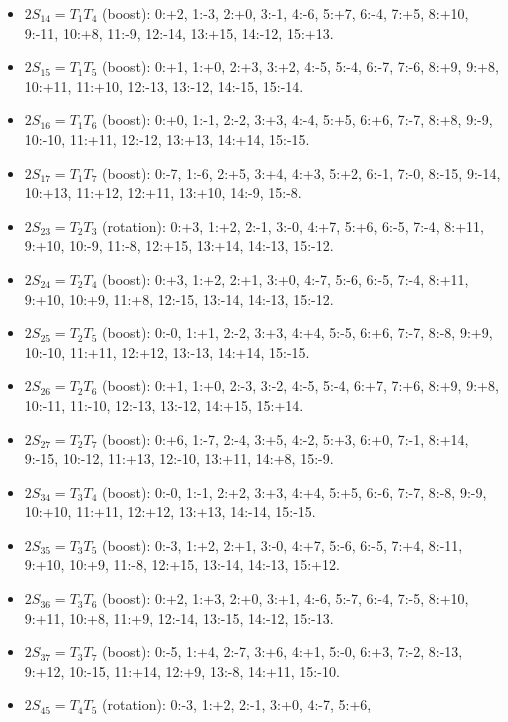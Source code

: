 \documentclass[
  10pt,
]{article}
\begin{document}
\begin{itemize}
  15:+13.
\item
  \(2S_{14} = T_1T_4\) (boost): 0:+2, 1:-3, 2:+0, 3:-1, 4:-6, 5:+7,
  6:-4, 7:+5, 8:+10, 9:-11, 10:+8, 11:-9, 12:-14, 13:+15, 14:-12,
  15:+13.
\item
  \(2S_{15} = T_1T_5\) (boost): 0:+1, 1:+0, 2:+3, 3:+2, 4:-5, 5:-4,
  6:-7, 7:-6, 8:+9, 9:+8, 10:+11, 11:+10, 12:-13, 13:-12, 14:-15,
  15:-14.
\item
  \(2S_{16} = T_1T_6\) (boost): 0:+0, 1:-1, 2:-2, 3:+3, 4:-4, 5:+5,
  6:+6, 7:-7, 8:+8, 9:-9, 10:-10, 11:+11, 12:-12, 13:+13, 14:+14,
  15:-15.
\item
  \(2S_{17} = T_1T_7\) (boost): 0:-7, 1:-6, 2:+5, 3:+4, 4:+3, 5:+2,
  6:-1, 7:-0, 8:-15, 9:-14, 10:+13, 11:+12, 12:+11, 13:+10, 14:-9,
  15:-8.
\item
  \(2S_{23} = T_2T_3\) (rotation): 0:+3, 1:+2, 2:-1, 3:-0, 4:+7, 5:+6,
  6:-5, 7:-4, 8:+11, 9:+10, 10:-9, 11:-8, 12:+15, 13:+14, 14:-13,
  15:-12.
\item
  \(2S_{24} = T_2T_4\) (boost): 0:+3, 1:+2, 2:+1, 3:+0, 4:-7, 5:-6,
  6:-5, 7:-4, 8:+11, 9:+10, 10:+9, 11:+8, 12:-15, 13:-14, 14:-13,
  15:-12.
\item
  \(2S_{25} = T_2T_5\) (boost): 0:-0, 1:+1, 2:-2, 3:+3, 4:+4, 5:-5,
  6:+6, 7:-7, 8:-8, 9:+9, 10:-10, 11:+11, 12:+12, 13:-13, 14:+14,
  15:-15.
\item
  \(2S_{26} = T_2T_6\) (boost): 0:+1, 1:+0, 2:-3, 3:-2, 4:-5, 5:-4,
  6:+7, 7:+6, 8:+9, 9:+8, 10:-11, 11:-10, 12:-13, 13:-12, 14:+15,
  15:+14.
\item
  \(2S_{27} = T_2T_7\) (boost): 0:+6, 1:-7, 2:-4, 3:+5, 4:-2, 5:+3,
  6:+0, 7:-1, 8:+14, 9:-15, 10:-12, 11:+13, 12:-10, 13:+11, 14:+8,
  15:-9.
\item
  \(2S_{34} = T_3T_4\) (boost): 0:-0, 1:-1, 2:+2, 3:+3, 4:+4, 5:+5,
  6:-6, 7:-7, 8:-8, 9:-9, 10:+10, 11:+11, 12:+12, 13:+13, 14:-14,
  15:-15.
\item
  \(2S_{35} = T_3T_5\) (boost): 0:-3, 1:+2, 2:+1, 3:-0, 4:+7, 5:-6,
  6:-5, 7:+4, 8:-11, 9:+10, 10:+9, 11:-8, 12:+15, 13:-14, 14:-13,
  15:+12.
\item
  \(2S_{36} = T_3T_6\) (boost): 0:+2, 1:+3, 2:+0, 3:+1, 4:-6, 5:-7,
  6:-4, 7:-5, 8:+10, 9:+11, 10:+8, 11:+9, 12:-14, 13:-15, 14:-12,
  15:-13.
\item
  \(2S_{37} = T_3T_7\) (boost): 0:-5, 1:+4, 2:-7, 3:+6, 4:+1, 5:-0,
  6:+3, 7:-2, 8:-13, 9:+12, 10:-15, 11:+14, 12:+9, 13:-8, 14:+11,
  15:-10.
\item
  \(2S_{45} = T_4T_5\) (rotation): 0:-3, 1:+2, 2:-1, 3:+0, 4:-7, 5:+6,

\end{itemize}
\end{document}
